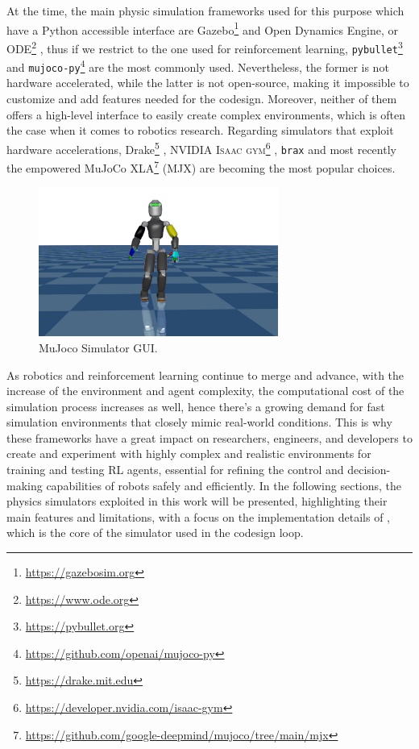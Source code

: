 At the time, the main physic simulation frameworks used for this purpose which have a Python accessible interface are Gazebo\footnote{\url{https://gazebosim.org}} \citep{koenig_design_2004} and Open Dynamics Engine, or ODE\footnote{\url{https://www.ode.org}}\citep{smith_open_2008} \citep{erez_simulation_2015,ivaldi_tools_2014}, thus if we restrict to the one used for reinforcement learning, \texttt{pybullet}\footnote{\url{https://pybullet.org}}\citep{coumans_pybullet_2016} and \texttt{mujoco-py}\footnote{\url{https://github.com/openai/mujoco-py}}\citep{todorov_mujoco_2012} are the most commonly used. Nevertheless, the former is not hardware accelerated, while the latter is not open-source, making it impossible to customize and add features needed for the codesign. Moreover, neither of them offers a high-level interface to easily create complex environments, which is often the case when it comes to robotics research.
Regarding simulators that exploit hardware accelerations, Drake\footnote{\url{https://drake.mit.edu}}
\citep{tedrake_drake_2016}, NVIDIA \textsc{Isaac gym}\footnote{\url{https://developer.nvidia.com/isaac-gym}} \citep{makoviychuk_isaac_2021}, \texttt{brax} \citep{freeman_brax_2021} and most recently the \jax empowered MuJoCo XLA\footnote{\url{https://github.com/google-deepmind/mujoco/tree/main/mjx}} (MJX) are becoming the most popular choices.

\begin{figure}
    \centering
    \caption[MuJoCo Simulator GUI]{MuJoco Simulator \ac{GUI}.}
    \label{fig:mujoco}
    \includegraphics[width=0.7\textwidth]{Images/mujoco_ergocub.png}
\end{figure}

As robotics and reinforcement learning continue to merge and advance, with the increase of the environment and agent complexity, the computational cost of the simulation process increases as well, hence there's a growing demand for fast simulation environments that closely mimic real-world conditions. This is why these frameworks have a great impact on researchers, engineers, and developers to create and experiment with highly complex and realistic environments for training and testing \ac{RL} agents, essential for refining the control and decision-making capabilities of robots safely and efficiently. In the following sections, the physics simulators exploited in this work will be presented, highlighting their main features and limitations, with a focus on the implementation details of \jax, which is the core of the simulator used in the codesign loop.

